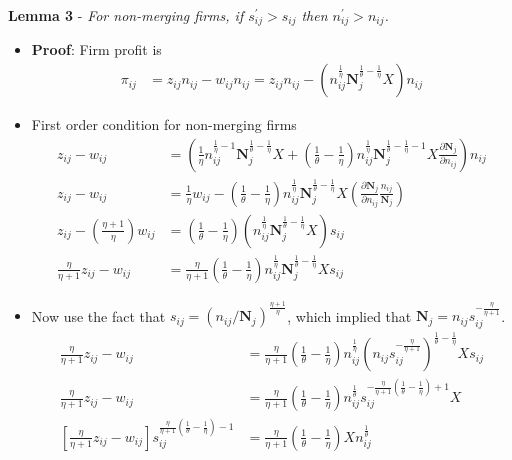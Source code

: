\documentclass[12pt]{article}
\theoremstyle{prop}
\begin{document}
\textbf{Lemma 3 }- \emph{For non-merging firms, if $s_{ij}^{\prime}>s_{ij}$
	then $n_{ij}^{\prime}>n_{ij}$.}
\begin{itemize}
	\item \textbf{Proof}: Firm profit is
	\begin{align*}
		\pi_{ij} & =z_{ij}n_{ij}-w_{ij}n_{ij}=z_{ij}n_{ij}-\left(n_{ij}^{\frac{1}{\eta}}\mathbf{N}_{j}^{\frac{1}{\theta}-\frac{1}{\eta}}X\right)n_{ij}
	\end{align*}
	\item First order condition for non-merging firms
	\begin{align*}
		z_{ij}-w_{ij} & =\left(\frac{1}{\eta}n_{ij}^{\frac{1}{\eta}-1}\mathbf{N}_{j}^{\frac{1}{\theta}-\frac{1}{\eta}}X+\left(\frac{1}{\theta}-\frac{1}{\eta}\right)n_{ij}^{\frac{1}{\eta}}\mathbf{N}_{j}^{\frac{1}{\theta}-\frac{1}{\eta}-1}X\frac{\partial\mathbf{N}_{j}}{\partial n_{ij}}\right)n_{ij}\\
		z_{ij}-w_{ij} & =\frac{1}{\eta}w_{ij}-\left(\frac{1}{\theta}-\frac{1}{\eta}\right)n_{ij}^{\frac{1}{\eta}}\mathbf{N}_{j}^{\frac{1}{\theta}-\frac{1}{\eta}}X\left(\frac{\partial\mathbf{N}_{j}}{\partial n_{ij}}\frac{n_{ij}}{\mathbf{N}_{j}}\right)\\
		z_{ij}-\left(\frac{\eta+1}{\eta}\right)w_{ij} & =\left(\frac{1}{\theta}-\frac{1}{\eta}\right)\left(n_{ij}^{\frac{1}{\eta}}\mathbf{N}_{j}^{\frac{1}{\theta}-\frac{1}{\eta}}X\right)s_{ij}\\
		\frac{\eta}{\eta+1}z_{ij}-w_{ij} & =\frac{\eta}{\eta+1}\left(\frac{1}{\theta}-\frac{1}{\eta}\right)n_{ij}^{\frac{1}{\eta}}\mathbf{N}_{j}^{\frac{1}{\theta}-\frac{1}{\eta}}Xs_{ij}
	\end{align*}
	\item Now use the fact that $s_{ij}=\left(n_{ij}/\mathbf{N}_{j}\right)^{\frac{\eta+1}{\eta}}$,
	which implied that $\mathbf{N}_{j}=n_{ij}s_{ij}^{-\frac{\eta}{\eta+1}}$.
	\begin{align*}
		\frac{\eta}{\eta+1}z_{ij}-w_{ij} & =\frac{\eta}{\eta+1}\left(\frac{1}{\theta}-\frac{1}{\eta}\right)n_{ij}^{\frac{1}{\eta}}\left(n_{ij}s_{ij}^{-\frac{\eta}{\eta+1}}\right)^{\frac{1}{\theta}-\frac{1}{\eta}}Xs_{ij}\\
		\frac{\eta}{\eta+1}z_{ij}-w_{ij} & =\frac{\eta}{\eta+1}\left(\frac{1}{\theta}-\frac{1}{\eta}\right)n_{ij}^{\frac{1}{\theta}}s_{ij}^{-\frac{\eta}{\eta+1}\left(\frac{1}{\theta}-\frac{1}{\eta}\right)+1}X\\
		\left[\frac{\eta}{\eta+1}z_{ij}-w_{ij}\right]s_{ij}^{\frac{\eta}{\eta+1}\left(\frac{1}{\theta}-\frac{1}{\eta}\right)-1} & =\frac{\eta}{\eta+1}\left(\frac{1}{\theta}-\frac{1}{\eta}\right)Xn_{ij}^{\frac{1}{\theta}}

\end{align*}
\end{itemize}
\end{document}
